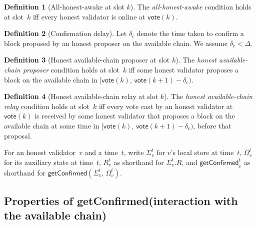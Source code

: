 \documentclass{article}
\newcommand{\syncer}{\mathsf{syncer}}
\newcommand{\start}{\mathsf{start}}
\newcommand{\vote}{\mathsf{vote}}
\newcommand{\getConfirmed}{\textsf{getConfirmed}\xspace}
\theoremstyle{plain}
\newtheorem{property}{Property}
\theoremstyle{definition}
\newtheorem{definition}{Definition}
\theoremstyle{remark}
\newcommand{\GST}{\ensuremath{\mathsf{GST}}}
\newcommand{\HAP}{honest available-chain proposer\xspace}
\newcommand{\HAR}{honest available-chain relay\xspace}
\newcommand{\AHA}{all-honest-awake\xspace}
\begin{document}
\begin{definition}[All-honest-awake at slot $k$]\label{rev:def:all-honest-awake}
The \emph{\AHA} condition holds at slot~$k$ iff every honest validator is online at $\vote(k)$.
\end{definition}

\begin{definition}[Confirmation delay]\label{rev:def:confirmation-delay}
Let $\delta_c$ denote the time taken to confirm a block proposed by an honest proposer on the available chain.
We assume $\delta_c < \Delta$.
\end{definition}

\begin{definition}[Honest available-chain proposer at slot $k$]\label{rev:def:honest-available-chain-proposer}
The \emph{\HAP} condition holds at slot~$k$ iff some honest validator proposes a block on the available chain in $[\vote(k),\, \vote(k+1) - \delta_c)$.
\end{definition}

\begin{definition}[Honest available-chain relay at slot $k$]\label{rev:def:honest-available-chain-relay}
The \emph{\HAR} condition holds at slot~$k$ iff every vote cast by an honest validator at $\vote(k)$ is received by some honest validator that proposes a block on the available chain at some time in $[\vote(k),\, \vote(k+1) - \delta_c)$, before that proposal.
\end{definition}

For an honest validator~$v$ and a time~$t$, write $\Sigma_v^t$ for $v$'s local store at time~$t$, $\Omega_v^t$ for its auxiliary state at time~$t$, $R_v^t$ as shorthand for $\Sigma_v^t.R$, and $\getConfirmed_v^t$ as shorthand for $\getConfirmed(\Sigma_v^t,\, \Omega_v^t)$.


\subsection{Properties of \getConfirmed (interaction with the available chain)}\label{rev:sec:getConfirmed-properties}
\end{document}
